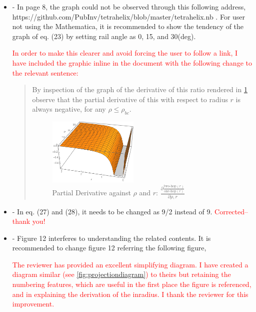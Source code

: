 \documentclass{article}
\newcommand{\highlighttext}[1] {\textcolor{red}{#1}}
\begin{document}
\begin{itemize}
\item 
- In page 8, the graph could not be observed through this following address,
https://github.com/PubInv/tetrahelix/blob/master/tetrahelix.nb . For user not using the
Mathematica, it is recommended to show the tendency of the graph of eq. (23) by setting
rail angle as 0, 15, and 30(deg).

\highlighttext{
  In order to make this clearer and avoid forcing the user to follow a link, I have included the graphic
  inline in the document with the following change to the relevant sentence:}

\begin{quote}

  By inspection of the graph of the derivative of this ratio rendered in \cref{fig:partialderivativediagram}
  observe that the partial derivative of this with respect to
radius $r$ is always negative, for any $\rho \leq \rho_{bc}$.

\begin{figure}
     \centering
     \includegraphics[width=0.45\textwidth]{figures/PartialDerivativeDiagram.png}
     \caption{Partial Derivative against $\rho$ and $r$: $ \frac{\partial \frac{\text{two-hop}(r)}{ \text{one-hop}(r)}}{\partial \rho, r} $ }
  \label{fig:partialderivativediagram}
\end{figure}
\end{quote}



\item
  - In eq. (27) and (28), it needs to be changed as 9/2 instead of 9.
  \highlighttext{Corrected--thank you!}  
  \item
- Figure 12 interferes to understanding the related contents. It is recommended to change
figure 12 referring the following figure,

\highlighttext{The reviewer has provided an excellent simplifying diagram. I have created a diagram similar
  (see \cref{fig:projectiondiagram})
  to theirs but retaining the numbering features, which are useful in the first place the
  figure is referenced, and in explaining the derivation of the inradius.
  I thank the reviewer for this improvement.}


\end{itemize}
\end{document}
